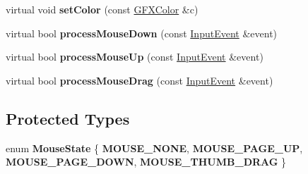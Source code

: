 \begin{DoxyCompactItemize}
\item 
virtual void {\bfseries set\+Color} (const \hyperlink{structGFXColor}{G\+F\+X\+Color} \&c)\hypertarget{classSlider_a58380f19d1788710ee6d6d3c36be46be}{}\label{classSlider_a58380f19d1788710ee6d6d3c36be46be}

\item 
virtual bool {\bfseries process\+Mouse\+Down} (const \hyperlink{structInputEvent}{Input\+Event} \&event)\hypertarget{classSlider_ad49c0c4c50447f0d446376b30b8123d4}{}\label{classSlider_ad49c0c4c50447f0d446376b30b8123d4}

\item 
virtual bool {\bfseries process\+Mouse\+Up} (const \hyperlink{structInputEvent}{Input\+Event} \&event)\hypertarget{classSlider_a5e9412c8aed648ceda212c22cc7daf0d}{}\label{classSlider_a5e9412c8aed648ceda212c22cc7daf0d}

\item 
virtual bool {\bfseries process\+Mouse\+Drag} (const \hyperlink{structInputEvent}{Input\+Event} \&event)\hypertarget{classSlider_ab6d044c17baa58b4ca86ee73af831cdf}{}\label{classSlider_ab6d044c17baa58b4ca86ee73af831cdf}

\end{DoxyCompactItemize}
\subsection*{Protected Types}
\begin{DoxyCompactItemize}
\item 
enum {\bfseries Mouse\+State} \{ {\bfseries M\+O\+U\+S\+E\+\_\+\+N\+O\+NE}, 
{\bfseries M\+O\+U\+S\+E\+\_\+\+P\+A\+G\+E\+\_\+\+UP}, 
{\bfseries M\+O\+U\+S\+E\+\_\+\+P\+A\+G\+E\+\_\+\+D\+O\+WN}, 
{\bfseries M\+O\+U\+S\+E\+\_\+\+T\+H\+U\+M\+B\+\_\+\+D\+R\+AG}
 \}\hypertarget{classSlider_a099e51ac0b390d8c4d88f61438a8e8cb}{}\label{classSlider_a099e51ac0b390d8c4d88f61438a8e8cb}

\end{DoxyCompactItemize}
